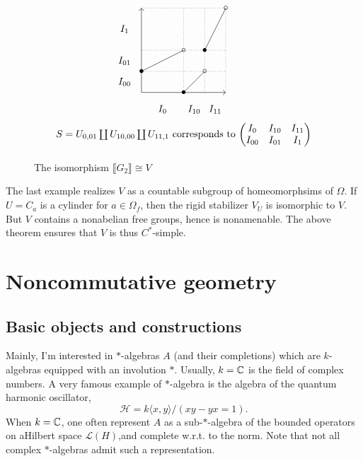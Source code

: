 \begin{figure}[ht]
\centering
\[\begin{tikzpicture}[scale=3] 

\draw[->] (0,0) -- (0,1);
\draw[->] (0,0) -- (1,0);
\draw[dotted] (1,0) -- (1,1);
\draw[dotted] (0,1) -- (1,1);

\draw (0,0.25) -- (0.5,0.5);
\draw (0.5, 0) -- (0.75,0.25);
\draw (0.75,0.5) -- (1,1);

\draw[dotted] (0.5,0) -- (0.5,1);
\draw[dotted] (0.75,0) -- (0.75,1);
\draw[dotted] (0,0.25) -- (1,0.25);
\draw[dotted] (0,0.5) -- (1,0.5);

\draw (0,0.25) node {$\bullet$}; \draw (0.5,0.5) node {$\circ$};
\draw (0.5,0)  node {$\bullet$}; \draw (0.75,0.25) node {$\circ$};
\draw (0.75,0.5) node {$\bullet$}; \draw (1,1) node {$\circ$};
\draw (0.5,-0.5) node {$S=U_{0,01}\coprod U_{10,00} \coprod U_{11,1}$ corresponds to $\begin{pmatrix} I_0 & I_{10} & I_{11} \\ I_{00} & I_{01} & I_1\end{pmatrix}$} ;


\draw (0.25,-0.2) node {$I_{0}$};
\draw (0.625,-0.2) node {$I_{10}$};
\draw (0.875,-0.2) node {$I_{11}$};
\draw (-0.2,0.125) node {$I_{00}$};
\draw (-0.2,0.375) node {$I_{01}$};
\draw (-0.2, 0.75) node {$I_{1}$};
\end{tikzpicture} \] 
\caption{The isomorphism $\llbracket G_2 \rrbracket \cong V$}
\end{figure}

The last example realizes $V$ as a countable subgroup of homeomorphsims of $\Omega$. If $U=C_a$ is a cylinder for $a\in \Omega_f$, then the rigid stabilizer $V_U$ is isomorphic to $V$. But $V$ contains a nonabelian free groups, hence is nonamenable. The above theorem ensures that $V$ is thus $C^*$-simple.  \\

\newpage
\section{Noncommutative geometry}

\subsection{Basic objects and constructions}

Mainly, I'm interested in $*$-algebras $A$ (and their completions) which are $k$-algebras equipped with an involution $*$. Usually, $k=\mathbb C$ is the field of complex numbers. A very famous example of $*$-algebra is the algebra of the quantum harmonic oscillator,
\[\mathcal H = k\langle x, y\rangle / (xy -yx = 1).\]
When $k=\mathbb C$, one often represent $A$ as a sub-$*$-algebra of the bounded operators on aHilbert space $\mathcal L(H)$,and complete w.r.t. to the norm. Note that not all complex $*$-algebras admit such a representation. \\

